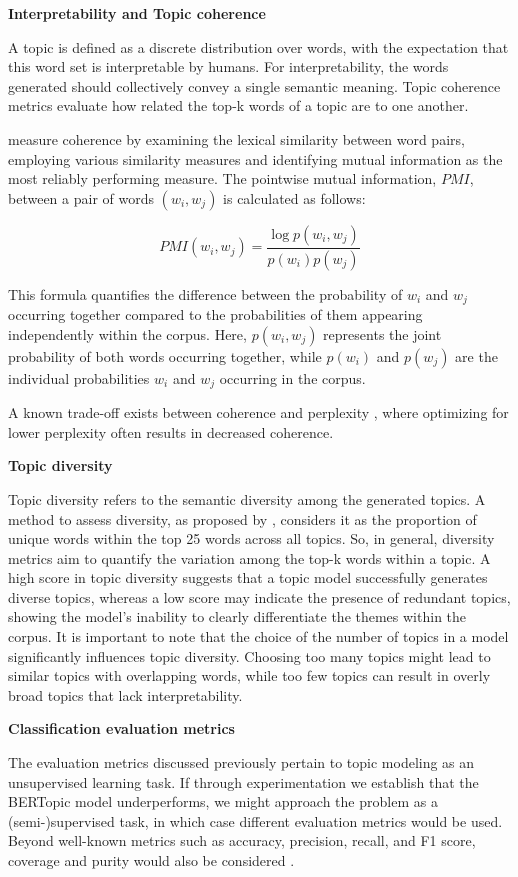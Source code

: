 \documentclass{article}
\begin{document}
\textbf{Interpretability and Topic coherence}

A topic is defined as a discrete distribution over words, with the expectation that this word set is interpretable by humans. For interpretability, the words generated should collectively convey a single semantic meaning. Topic coherence metrics evaluate how related the top-k words of a topic are to one another.

\citet{newman_automatic_2010} measure coherence by examining the lexical similarity between word pairs, employing various similarity measures and identifying mutual information as the most reliably performing measure. The pointwise mutual information, $PMI$, between a pair of words $(w_i, w_j)$ is calculated as follows:

\[PMI(w_i, w_j) = \frac{\log p(w_i, w_j)}{p(w_i)p(w_j)}\]

This formula quantifies the difference between the probability of $w_i$ and $w_j$ occurring together compared to the probabilities of them appearing independently within the corpus. Here, $p(w_i,w_j)$ represents the joint probability of both words occurring together, while $p(w_i)$ and $p(w_j)$ are the individual probabilities $w_i$ and $w_j$ occurring in the corpus.

A known trade-off exists between coherence and perplexity \cite{chang_reading_2009}, where optimizing for lower perplexity often results in decreased coherence.

\textbf{Topic diversity}

Topic diversity refers to the semantic diversity among the generated topics. A method to assess diversity, as proposed by \citet{dieng_topic_2020}, considers it as the proportion of unique words within the top 25 words across all topics. So, in general, diversity metrics aim to quantify the variation among the top-k words within a topic. A high score in topic diversity suggests that a topic model successfully generates diverse topics, whereas a low score may indicate the presence of redundant topics, showing the model's inability to clearly differentiate the themes within the corpus. It is important to note that the choice of the number of topics in a model significantly influences topic diversity. Choosing too many topics might lead to similar topics with overlapping words, while too few topics can result in overly broad topics that lack interpretability.

\textbf{Classification evaluation metrics}

The evaluation metrics discussed previously pertain to topic modeling as an unsupervised learning task. If through experimentation we establish that the BERTopic model underperforms, we might approach the problem as a (semi-)supervised task, in which case different evaluation metrics would be used. Beyond well-known metrics such as accuracy, precision, recall, and F1 score, coverage and purity would also be considered \cite{churchill_evolution_2022}.
\end{document}
